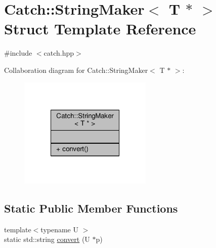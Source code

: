 \hypertarget{struct_catch_1_1_string_maker_3_01_t_01_5_01_4}{\section{Catch\-:\-:String\-Maker$<$ T $\ast$ $>$ Struct Template Reference}
\label{struct_catch_1_1_string_maker_3_01_t_01_5_01_4}
}


{\ttfamily \#include $<$catch.\-hpp$>$}



Collaboration diagram for Catch\-:\-:String\-Maker$<$ T $\ast$ $>$\-:
\nopagebreak
\begin{figure}[H]
\begin{center}
\leavevmode
\includegraphics[width=180pt]{struct_catch_1_1_string_maker_3_01_t_01_5_01_4__coll__graph}
\end{center}
\end{figure}
\subsection*{Static Public Member Functions}
\begin{DoxyCompactItemize}
\item 
{\footnotesize template$<$typename U $>$ }\\static std\-::string \hyperlink{struct_catch_1_1_string_maker_3_01_t_01_5_01_4_a2adbc75c99d71b8323f4052bcb0815c9}{convert} (U $\ast$p)
\end{DoxyCompactItemize}


